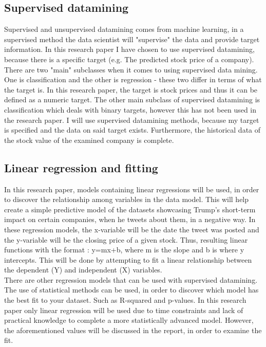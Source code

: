\documentclass[11pt]{article}
\begin{document}
\subsection{Supervised datamining}
Supervised and unsupervised datamining comes from machine learning, in a supervised method the data scientist will "supervise" the data and provide target information. In this research paper I have chosen to use supervised datamining, because there is a specific target (e.g. The predicted stock price of a company).  There are two "main" subclasses when it comes to using supervised data mining. One is classification and the other is regression - these two differ in terms of what the target is. In this research paper, the target is stock prices and thus it can be defined as a numeric target. The other main subclass of supervised datamining is classification which deals with binary targets, however this has not been used in the research paper. I will use supervised datamining methods, because my target is specified and the data on said target exists. Furthermore, the historical data of the stock value of the examined company is complete.


\subsection{Linear regression and fitting}
In this research paper, models containing linear regressions will be used, in order to discover the relationship among variables in the data model.  This will help create a simple predictive model of the datasets showcasing Trump's short-term impact on certain companies, when he tweets about them, in a negative way. In these regression models, the x-variable will be the date the tweet was posted and the y-variable will be the closing price of a given stock. Thus, resulting linear  functions with the format : y=mx+b, where m is the slope and b is where y intercepts. This will be done by attempting to fit a linear relationship between the dependent (Y) and independent (X) variables. \\

There are other regression models that can be used with supervised datamining. The use of statistical methods can be used, in order to discover which model has the best fit to your dataset. Such as  R-squared and p-values. In this research paper only linear regression will be used due to time constraints and lack of practical knowledge to complete a more statistically advanced model. However, the aforementioned values will be discussed in the report, in order to examine the fit. \\
\end{document}
